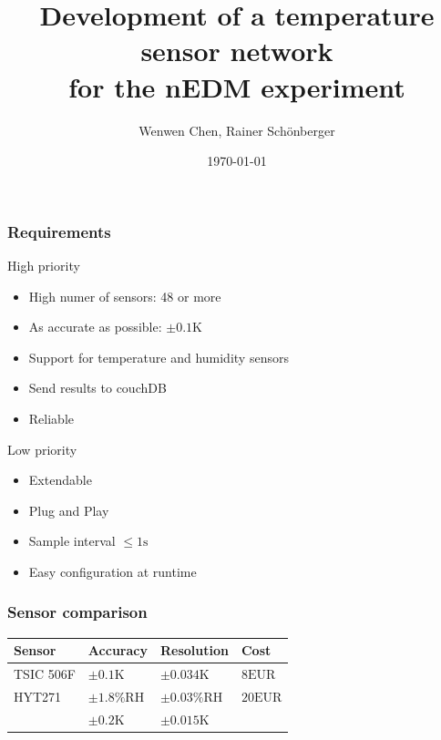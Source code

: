 \documentclass[t]{beamer}
\title{Development of a temperature sensor network\\for the nEDM experiment}
\author{Wenwen Chen, Rainer Schönberger}
\date{\today}
\begin{document}
\begin{frame}
    \titlepage
\end{frame}




\begin{frame}[c]
    \frametitle{Requirements}
		\begin{alertblock}{High priority}
			\begin{itemize}
				\item High numer of sensors: 48 or more
				\item As accurate as possible:  $\pm0.1\mathrm{K}$
				\item Support for temperature and humidity sensors
				\item Send results to couchDB
				\item Reliable
			\end{itemize}
		\end{alertblock}
		\begin{exampleblock}{Low priority}
			\begin{itemize}
				\item Extendable
				\item Plug and Play
				\item Sample interval $\le 1\mathrm{s}$
				\item Easy configuration at runtime
			\end{itemize}
		\end{exampleblock}
\end{frame}
\begin{frame}[c]
    \frametitle{Sensor comparison}
\begin{tabular}{ M M M M}
	Sensor & Accuracy & Resolution & Cost\tabularnewline
	\hline
	\hline
	TSIC 506F& $\pm 0.1\mathrm{K}$ & $\pm 0.034\mathrm{K}$ & $8 \mathrm{EUR}$\tabularnewline
	\hline
	HYT271 & $\pm 1.8\mathrm{\%RH}$ & $\pm 0.03\mathrm{\%RH}$ & $20 \mathrm{EUR}$\tabularnewline
	& $\pm 0.2\mathrm{K}$ & $\pm 0.015\mathrm{K}$ & \tabularnewline
	\hline
\end{tabular}
\end{frame}
\end{document}
